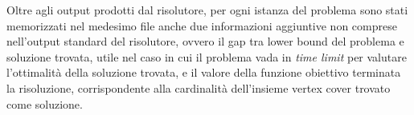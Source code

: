 Oltre agli output prodotti dal risolutore, per ogni istanza del problema sono stati memorizzati nel medesimo file anche due informazioni aggiuntive non comprese nell'output standard del risolutore, ovvero il gap tra lower bound del problema e soluzione trovata, utile nel caso in cui il problema vada in \textit{time limit} per valutare l'ottimalità della soluzione trovata, e il valore della funzione obiettivo terminata la risoluzione, corrispondente alla cardinalità dell'insieme vertex cover trovato come soluzione.

%


